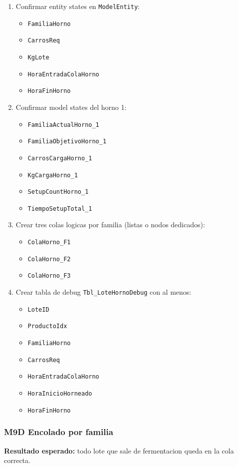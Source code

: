 \documentclass[11pt]{article}
\newcommand{\simio}[1]{\texttt{#1}}
\newcommand{\tabla}[1]{\texttt{#1}}
\newcommand{\state}[1]{\texttt{#1}}
\begin{document}
\begin{enumerate}
  \item Confirmar entity states en \simio{ModelEntity}:
  \begin{itemize}
    \item \state{FamiliaHorno}
    \item \state{CarrosReq}
    \item \state{KgLote}
    \item \state{HoraEntradaColaHorno}
    \item \state{HoraFinHorno}
  \end{itemize}
  \item Confirmar model states del horno 1:
  \begin{itemize}
    \item \state{FamiliaActualHorno\_1}
    \item \state{FamiliaObjetivoHorno\_1}
    \item \state{CarrosCargaHorno\_1}
    \item \state{KgCargaHorno\_1}
    \item \state{SetupCountHorno\_1}
    \item \state{TiempoSetupTotal\_1}
  \end{itemize}
  \item Crear tres colas logicas por familia (listas o nodos dedicados):
  \begin{itemize}
    \item \simio{ColaHorno\_F1}
    \item \simio{ColaHorno\_F2}
    \item \simio{ColaHorno\_F3}
  \end{itemize}
  \item Crear tabla de debug \tabla{Tbl\_LoteHornoDebug} con al menos:
  \begin{itemize}
    \item \state{LoteID}
    \item \state{ProductoIdx}
    \item \state{FamiliaHorno}
    \item \state{CarrosReq}
    \item \state{HoraEntradaColaHorno}
    \item \state{HoraInicioHorneado}
    \item \state{HoraFinHorno}
  \end{itemize}
\end{enumerate}

\subsubsection{M9D Encolado por familia}
\textbf{Resultado esperado:} todo lote que sale de fermentacion queda en la cola correcta.
\end{document}
